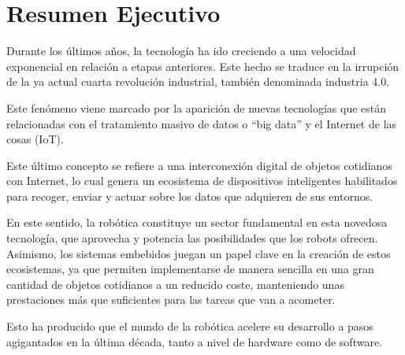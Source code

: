 \documentclass[a4paper,11pt,spanish]{sphinxmanual}
\newcommand\blankpage{%
    \null
    \thispagestyle{empty}%
    \newpage}
\begin{document}
\afterpage{\blankpage}

\newpage
\thispagestyle{plain}
\section*{Resumen Ejecutivo} %


Durante los últimos años, la tecnología ha ido creciendo a una velocidad exponencial en relación a etapas anteriores. Este hecho se traduce en la irrupción de la ya actual cuarta revolución industrial, también denominada industria 4.0.

Este fenómeno viene marcado por la aparición de nuevas tecnologías que están relacionadas con el tratamiento masivo de datos o “big data” y el Internet de las cosas (IoT).

Este último concepto se refiere a una interconexión digital de objetos cotidianos con Internet, lo cual genera un ecosistema de dispositivos inteligentes habilitados para recoger, enviar y actuar sobre los datos que adquieren de sus entornos.

En este sentido, la robótica constituye un sector fundamental en esta novedosa tecnología, que aprovecha y potencia las posibilidades que los robots ofrecen. Asimismo, los sistemas embebidos juegan un papel clave en la creación de estos ecosistemas, ya que permiten implementarse de manera sencilla en una gran cantidad de objetos cotidianos a un reducido coste, manteniendo unas prestaciones más que suficientes para las tareas que van a acometer.

Esto ha producido que el mundo de la robótica acelere su desarrollo a pasos agigantados en la última década, tanto a nivel de hardware como de software.
\end{document}
